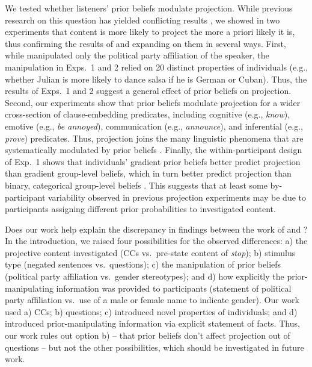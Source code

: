 \documentclass[OpenMind]{stjour}
\begin{document}
We tested whether listeners' prior beliefs modulate projection. While previous research on this question has yielded conflicting results \citep{mahler2020, lorson2018}, we showed in two experiments that content is more likely to project the more a priori likely it is, thus confirming the results of \citet{mahler2020} and expanding on them in several ways. First, while \citet{mahler2020} manipulated only the political party affiliation of the speaker, the manipulation in Exps.~1 and 2 relied on 20 distinct properties of individuals (e.g., whether Julian is more likely to dance salsa if he is German or Cuban). Thus, the results of Exps.~1 and 2 suggest a general effect of prior beliefs on projection. Second, our experiments show that prior beliefs modulate projection for a wider cross-section of clause-embedding predicates, including cognitive (e.g., {\em know}), emotive (e.g., {\em be annoyed}), communication (e.g., {\em announce}), and inferential (e.g., {\em prove}) predicates. Thus, projection joins the many linguistic phenomena that are systematically modulated by prior beliefs \citep{hagoort-etal2004,hald-etal2007,warren2007, chambers-etal04,bicknell-rohde2009,tessler-goodman2019, degen-etal2015, kravtchenko2015, westerbeek2015, sedivy2003}. Finally, the within-participant design of Exp.~1 shows that individuals' gradient prior beliefs better predict projection than gradient group-level beliefs, which in turn better predict projection than binary, categorical group-level  beliefs \citep[as investigated by][]{mahler2020}. This suggests that at least some by-participant variability observed in previous projection experiments  \citep[see, e.g.,][]{tbd-variability,tonhauser-degen-factive} may be due to participants assigning different prior probabilities to investigated content.

Does our work help explain the discrepancy in findings between the work of \citet{mahler2020} and \citet{lorson2018}? In the introduction, we raised four possibilities for the observed differences:  a) the projective content investigated (CCs vs.\ pre-state content of {\em stop}); b) stimulus type (negated sentences vs.\ questions); c) the manipulation of prior beliefs (political party affiliation vs.\ gender stereotypes); and d) how explicitly the prior-manipulating information was provided to participants (statement of political party affiliation vs.\  use of a male or female name to indicate gender). Our work used a) CCs; b) questions; c) introduced novel properties of individuals; and d) introduced prior-manipulating information via explicit statement of facts. Thus, our work rules out option b) --  that prior beliefs don't affect projection out of questions -- but not the other possibilities, which should be investigated in future work. %
\end{document}
